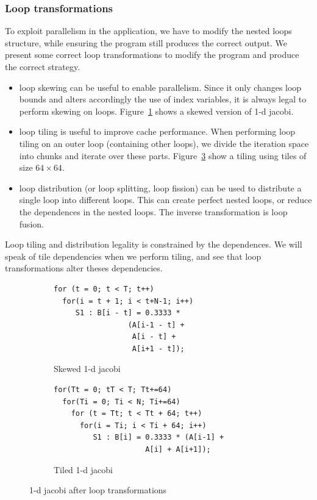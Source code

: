 \documentclass[a4paper,11pt]{article}
\begin{document}
\subsubsection{Loop transformations}
To exploit parallelism in the application, we have to modify the nested loops structure, while
ensuring the program still produces the correct output. We present some correct loop
transformations \cite{bacon_compiler_1994} to modify the program and produce the correct strategy.
\begin{itemize}
 \item  loop skewing can be useful to enable parallelism. Since it only changes loop bounds
	and alters accordingly the use of index variables, it is always legal to perform skewing
	on loops. Figure~\ref{jbi1d_tr:skewed} shows a skewed version of 1-d jacobi.
 \item  loop tiling is useful to improve cache performance. When performing loop tiling on
	an outer loop (containing other loops), we divide the iteration space into chunks and
	iterate over these parts. Figure~\ref{jbi1d_tr:tiled} show a tiling using tiles of
	size $64 \times 64$.
 \item 	loop distribution (or loop splitting, loop fission) can be used to distribute a single 
	loop into different loops. This can create perfect nested loops, or reduce the
	dependences in the nested loops. The inverse transformation is loop fusion.
\end{itemize}
Loop tiling and distribution legality is constrained by the dependences. We will speak of
tile dependencies when we perform tiling, and see that loop transformations alter theses
dependencies.
\begin{figure}
 \begin{subfigure}{.5\textwidth}
  \begin{verbatim}
for (t = 0; t < T; t++)
  for(i = t + 1; i < t+N-1; i++)
     S1 : B[i - t] = 0.3333 *
                 (A[i-1 - t] +
                  A[i - t] +
                  A[i+1 - t]);
  \end{verbatim}
  \caption{Skewed 1-d jacobi}
  \label{jbi1d_tr:skewed} 
 \end{subfigure}
 \begin{subfigure}{.5\textwidth}
  \begin{verbatim}
for(Tt = 0; tT < T; Tt+=64)
  for(Ti = 0; Ti < N; Ti+=64)
    for (t = Tt; t < Tt + 64; t++)
      for(i = Ti; i < Ti + 64; i++)
         S1 : B[i] = 0.3333 * (A[i-1] +
                     A[i] + A[i+1]);
  \end{verbatim}
  \caption{Tiled 1-d jacobi}
  \label{jbi1d_tr:tiled}
 \end{subfigure}
  \caption{1-d jacobi after loop transformations}
\end{figure}
\end{document}
